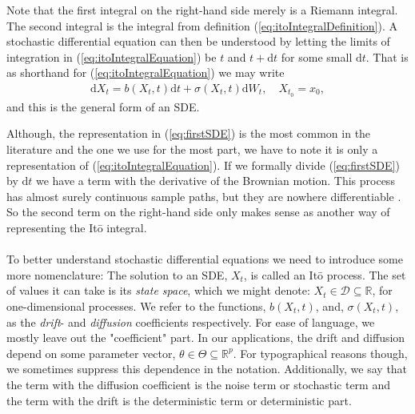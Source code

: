 Note that the first integral on the right-hand side merely is a Riemann integral. The second integral is the integral from definition (\ref{eq:itoIntegralDefinition}). A stochastic differential equation can then be understood by letting the limits of integration in (\ref{eq:itoIntegralEquation}) be $t$ and $t+\mathrm{d}t$ for some small $\mathrm{d}t$. That is as shorthand for (\ref{eq:itoIntegralEquation}) we may write
\begin{align}
    \mathrm{d}X_t = b(X_t, t)\mathrm{d}t + \sigma(X_t, t)\mathrm{d}W_t, \quad X_{t_0} = x_0 \label{eq:firstSDE},
\end{align}
and this is the general form of an SDE. 

Although, the representation in (\ref{eq:firstSDE}) is the most common in the literature and the one we use for the most part, we have to note it is only a representation of (\ref{eq:itoIntegralEquation}). If we formally divide (\ref{eq:firstSDE}) by $\mathrm{d}t$ we have a term with the derivative of the Brownian motion. This process has almost surely continuous sample paths, but they are nowhere differentiable \cite[theorem 11.22 and theorem 11.35]{Hansen2022}. So the second term on the right-hand side only makes sense as another way of representing the Itō integral. \\\\
To better understand stochastic differential equations we need to introduce some more nomenclature: The solution to an SDE, $X_t$, is called an Itō process. The set of values it can take is its \textit{state space}, which we might denote: $X_t\in\mathcal{D}\subseteq\mathbb{R}$, for one-dimensional processes. We refer to the functions, $b(X_t, t)$, and, $\sigma(X_t, t)$, as the \textit{drift}- and \textit{diffusion} coefficients respectively. For ease of language, we mostly leave out the "coefficient" part. In our applications, the drift and diffusion depend on some parameter vector, $\theta\in\Theta\subseteq\mathbb{R}^p$. For typographical reasons though, we sometimes suppress this dependence in the notation. Additionally, we say that the term with the diffusion coefficient is the noise term or stochastic term and the term with the drift is the deterministic term or deterministic part. 

